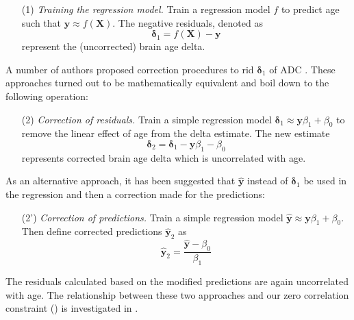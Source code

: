 \documentclass[utf8]{frontiersSCNS} %
\renewcommand{\d}{\boldsymbol{\delta}}
\newcommand{\X}{\mathbf{X}}
\newcommand{\y}{\mathbf{y}}
\newcommand{\yh}{\mathbf{\hat{y}}}
\begin{document}
\begin{enumerate}
    \item[(1)]\textit{Training the regression model.} Train a regression model $f$ to predict age such that $\y \approx f(\X)$. The negative residuals, denoted as 
    \begin{equation}\label{eq:twostage1}
         \d_1 = f(\X) - \y
    \end{equation}
    represent the (uncorrected) brain age delta. 
\end{enumerate}

A number of authors proposed correction procedures to rid $\d_1$ of ADC  \citep{Le2018ABrainAGE,Smith2019EstimationImaging,Beheshti2019Bias-adjustmentScheme}. These approaches turned out to be mathematically equivalent and boil down to the following operation:
    
\begin{enumerate}
    \setcounter{enumi}{1}
    \item[(2)]\textit{Correction of residuals.} Train a simple regression model $\d_1\approx\y\beta_1 + \beta_0$ to remove the linear effect of age from the delta estimate. The new estimate
    \begin{equation}\label{eq:twostage2}
         \d_2 = \d_1 - \y\beta_1 - \beta_0
    \end{equation}
    represents corrected brain age delta which is uncorrelated with age.
\end{enumerate}

As an alternative approach, it has been suggested that $\yh$ instead of $\d_1$ be used in the regression  \citep{Cole2018BrainMortality,deLange2020Commentary:Prediction} and then a correction made for the predictions:

\begin{enumerate}
    \setcounter{enumi}{1}
    \item[(2')]\textit{Correction of predictions.} Train a simple regression model $\yh\approx\y\beta_1 + \beta_0$. Then define corrected predictions $\yh_2$ as 
    \begin{equation}\label{eq:twostage2b}
         \yh_2 = \frac{\yh - \beta_0}{\beta_1}
    \end{equation}

\end{enumerate}

The residuals calculated based on the modified predictions are again uncorrelated with age. The relationship between these two approaches and our zero correlation constraint () is investigated in .
\end{document}
